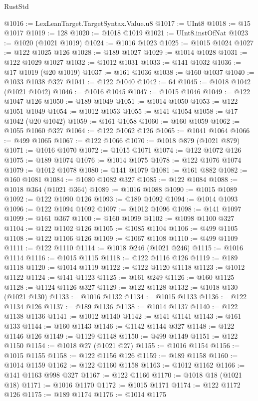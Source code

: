 \begin{lexlean}{RustStd}
\begin{coremodule}
@1016 := LexLeanTarget.TargetSyntax.Value.u8
@1017 := UInt8
@1018 := @15 @1017
@1019 := 128
@1020 := @1018 @1019
@1021 := UInt8.instOfNat
@1023 := @1020 (@1021 @1019)
@1024 := @1016 @1023
@1025 := @1015 @1024
@1027 := @122 @1025 @126
@1028 := @189 @1027
@1029 := @1014 @1028
@1031 := @122 @1029 @1027
@1032 := @1012 @1031
@1033 := @141 @1032
@1036 := @17 @1019 (@20 @1019)
@1037 := @161 @1036
@1038 := @160 @1037
@1040 := @1033 @1038 @327
@1041 := @122 @1040
@1042 := 64
@1045 := @1018 @1042 (@1021 @1042)
@1046 := @1016 @1045
@1047 := @1015 @1046
@1049 := @122 @1047 @126
@1050 := @189 @1049
@1051 := @1014 @1050
@1053 := @122 @1051 @1049
@1054 := @1012 @1053
@1055 := @141 @1054
@1058 := @17 @1042 (@20 @1042)
@1059 := @161 @1058
@1060 := @160 @1059
@1062 := @1055 @1060 @327
@1064 := @122 @1062 @126
@1065 := @1041 @1064
@1066 := @499 @1065
@1067 := @122 @1066
@1070 := @1018 @879 (@1021 @879)
@1071 := @1016 @1070
@1072 := @1015 @1071
@1074 := @122 @1072 @126
@1075 := @189 @1074
@1076 := @1014 @1075
@1078 := @122 @1076 @1074
@1079 := @1012 @1078
@1080 := @141 @1079
@1081 := @161 @882
@1082 := @160 @1081
@1084 := @1080 @1082 @327
@1085 := @122 @1084
@1088 := @1018 @364 (@1021 @364)
@1089 := @1016 @1088
@1090 := @1015 @1089
@1092 := @122 @1090 @126
@1093 := @189 @1092
@1094 := @1014 @1093
@1096 := @122 @1094 @1092
@1097 := @1012 @1096
@1098 := @141 @1097
@1099 := @161 @367
@1100 := @160 @1099
@1102 := @1098 @1100 @327
@1104 := @122 @1102 @126
@1105 := @1085 @1104
@1106 := @499 @1105
@1108 := @122 @1106 @126
@1109 := @1067 @1108
@1110 := @499 @1109
@1111 := @122 @1110
@1114 := @1018 @246 (@1021 @246)
@1115 := @1016 @1114
@1116 := @1015 @1115
@1118 := @122 @1116 @126
@1119 := @189 @1118
@1120 := @1014 @1119
@1122 := @122 @1120 @1118
@1123 := @1012 @1122
@1124 := @141 @1123
@1125 := @161 @249
@1126 := @160 @1125
@1128 := @1124 @1126 @327
@1129 := @122 @1128
@1132 := @1018 @130 (@1021 @130)
@1133 := @1016 @1132
@1134 := @1015 @1133
@1136 := @122 @1134 @126
@1137 := @189 @1136
@1138 := @1014 @1137
@1140 := @122 @1138 @1136
@1141 := @1012 @1140
@1142 := @141 @1141
@1143 := @161 @133
@1144 := @160 @1143
@1146 := @1142 @1144 @327
@1148 := @122 @1146 @126
@1149 := @1129 @1148
@1150 := @499 @1149
@1151 := @122 @1150
@1154 := @1018 @27 (@1021 @27)
@1155 := @1016 @1154
@1156 := @1015 @1155
@1158 := @122 @1156 @126
@1159 := @189 @1158
@1160 := @1014 @1159
@1162 := @122 @1160 @1158
@1163 := @1012 @1162
@1166 := @141 @1163 @998 @327
@1167 := @122 @1166
@1170 := @1018 @18 (@1021 @18)
@1171 := @1016 @1170
@1172 := @1015 @1171
@1174 := @122 @1172 @126
@1175 := @189 @1174
@1176 := @1014 @1175

\end{coremodule}
\end{lexlean}
